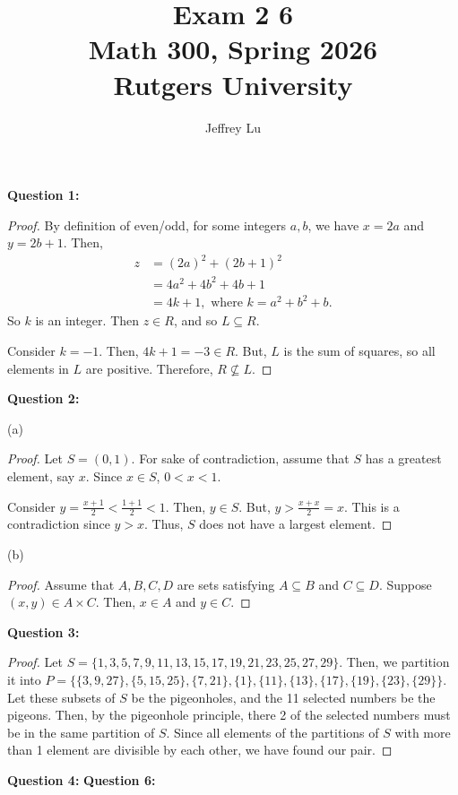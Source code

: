 \documentclass[12pt]{article}
\title{Exam 2 6\\ \large Math 300, Spring 2026 \\ Rutgers University}
\author{Jeffrey Lu}
\begin{document}
\maketitle

\noindent{}\textbf{Question 1:}

\begin{proof}
    By definition of even/odd, for some integers $a,b$, we have $x = 2a$ and $y = 2b+1$.
    Then,
    \begin{align*}
        z & = (2a)^2 + (2b+1)^2                       \\
          & = 4a^2 + 4b^2 + 4b + 1                    \\
          & = 4k +1, \text{ where }k = a^2 + b^2 + b.
    \end{align*}
    So $k$ is an integer. Then $z \in R$, and so $L \subseteq R$.

    Consider $k= -1$. Then, $4k+1 = -3 \in R$.
    But, $L$ is the sum of squares, so all elements in $L$ are positive.
    Therefore, $R \not\subseteq L$.
\end{proof}

\noindent{}\textbf{Question 2:}

(a)
\begin{proof}
    Let $S = (0,1)$.
    For sake of contradiction, assume that $S$ has a greatest element, say $x$.
    Since $x \in S$, $0 < x < 1$.

    Consider $y = \frac{x+1}{2} < \frac{1+1}{2} < 1$.
    Then, $y \in S$.
    But, $y > \frac{x+x}{2} = x$.
    This is a contradiction since $y > x$.
    Thus, $S$ does not have a largest element.
\end{proof}

(b)
\begin{proof}
    Assume that $A, B, C, D$ are sets satisfying $A \subseteq B$ and $C \subseteq D$.
    Suppose $(x,y) \in A \times C$.
    Then, $x \in A$ and $y \in C$.
\end{proof}

\noindent{}\textbf{Question 3:}
\begin{proof}
    Let $S = \{ 1, 3, 5, 7, 9, 11, 13, 15, 17, 19, 21, 23, 25, 27, 29 \}$.
    Then, we partition it into $P = \{
        \{3, 9, 27\},
        \{5, 15, 25 \},
        \{7, 21 \},
        \{1\},
        \{11 \},
        \{13\},
        \{17\},
        \{19\},
        \{23\},
        \{29\}
        \}$.
    Let these subsets of $S$ be the pigeonholes, and the 11 selected numbers be the pigeons.
    Then, by the pigeonhole principle, there 2 of the selected numbers must be in the same partition of $S$.
    Since all elements of the partitions of $S$ with more than 1 element are divisible by each other,
    we have found our pair.
\end{proof}



\noindent{}\textbf{Question 4:}
\noindent{}\textbf{Question 6:}
\end{document}
